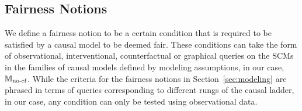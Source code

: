 \subsection{Fairness Notions}
We define a fairness notion to be a certain condition that is required to be satisfied by a causal model to be deemed fair. These conditions can take the form of observational, interventional, counterfactual or graphical queries on the SCMs in the families of causal models defined by modeling assumptions, in our case, $\mathbb{M}_{\text{no-cf}}$. While the criteria for the fairness notions in Section~\ref{sec:modeling} are phrased in terms of queries corresponding to different rungs of the causal ladder, in our case, any condition can only be tested using observational data.




